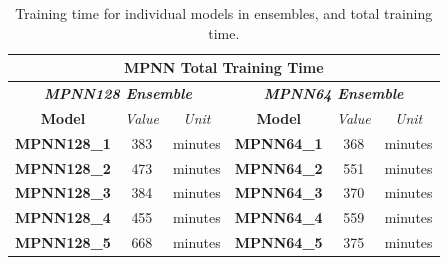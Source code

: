     \begin{table}[H]
        \centering
        \caption{Training time for individual models in ensembles, and total training time.}
        \label{tab:train-time}
        \begin{tabular}{|cccccl|}
        \hline
        \multicolumn{6}{|c|}{\textbf{MPNN Total Training Time}}                                                                                                                                                                                                            \\ \hline
        \multicolumn{3}{|c|}{\textit{\textbf{MPNN128 Ensemble}}}                                                                         & \multicolumn{3}{c|}{\textit{\textbf{MPNN64 Ensemble}}}                                                                          \\ \hline
        \multicolumn{1}{|c|}{\textbf{Model}}                  & \multicolumn{1}{c|}{\textit{Value}} & \multicolumn{1}{c|}{\textit{Unit}} & \multicolumn{1}{c|}{\textbf{Model}}                  & \multicolumn{1}{c|}{\textit{Value}} & \multicolumn{1}{c|}{\textit{Unit}} \\ \hline
        \multicolumn{1}{|c|}{\textbf{MPNN128\_1}}             & \multicolumn{1}{c|}{383}            & \multicolumn{1}{c|}{minutes}       & \multicolumn{1}{c|}{\textbf{MPNN64\_1}}              & \multicolumn{1}{c|}{368}            & minutes                            \\ \hline
        \multicolumn{1}{|c|}{\textbf{MPNN128\_2}}             & \multicolumn{1}{c|}{473}            & \multicolumn{1}{c|}{minutes}       & \multicolumn{1}{c|}{\textbf{MPNN64\_2}}              & \multicolumn{1}{c|}{551}            & minutes                            \\ \hline
        \multicolumn{1}{|c|}{\textbf{MPNN128\_3}}             & \multicolumn{1}{c|}{384}            & \multicolumn{1}{c|}{minutes}       & \multicolumn{1}{c|}{\textbf{MPNN64\_3}}              & \multicolumn{1}{c|}{370}            & minutes                            \\ \hline
        \multicolumn{1}{|c|}{\textbf{MPNN128\_4}}             & \multicolumn{1}{c|}{455}            & \multicolumn{1}{c|}{minutes}       & \multicolumn{1}{c|}{\textbf{MPNN64\_4}}              & \multicolumn{1}{c|}{559}            & minutes                            \\ \hline
        \multicolumn{1}{|c|}{\textbf{MPNN128\_5}}             & \multicolumn{1}{c|}{668}            & \multicolumn{1}{c|}{minutes}       & \multicolumn{1}{c|}{\textbf{MPNN64\_5}}              & \multicolumn{1}{c|}{375}            & minutes                            \\ \hline

\end{tabular}
\end{table}
